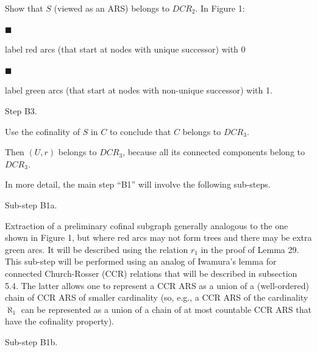 Show that $S$ (viewed as an ARS) belongs to $DCR_{2}$. In Figure 1:\par
  
\par\noindent  $\blacksquare$ 
 
label red arcs (that start at nodes with unique successor) with 0\par
 
 
 
\par\noindent  $\blacksquare$ 
 
label green arcs (that start at nodes with non-unique successor) with 1.\par
 
 
  
  Step B3.  
 
Use the cofinality of $S$ in $C$ to conclude that $C$ belongs to $DCR_{3}$.\par
 
   
   
Then $(U,r)$ belongs to $DCR_{3}$, because all its connected components belong to $DCR_{3}$.\par
 
 
 
In more detail, the main step “B1” will involve the following sub-steps.\par
  Sub-step B1a.  
 
Extraction of a preliminary cofinal subgraph generally analogous to the one shown in Figure 1, but where red arcs may not form trees and there may be extra green arcs. It will be described using the relation $r_{1}$ in the proof of Lemma 29. This sub-step will be performed using an analog of Iwamura’s lemma for connected Church-Rosser (CCR) relations that will be described in subsection 5.4. The latter allows one to represent a CCR ARS as a union of a (well-ordered) chain of CCR ARS of smaller cardinality (so, e.g., a CCR ARS of the cardinality $\aleph_{1}$ can be represented as a union of a chain of at most countable CCR ARS that have the cofinality property).\par
 
  Sub-step B1b.  
 
